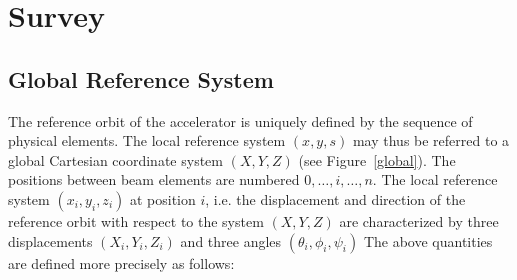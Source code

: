 
\chapter{Survey}
\label{survey}

\section{Global Reference System}
\label{layout}
The reference orbit of the accelerator is uniquely defined by the
sequence of physical elements.
The local reference system $(x, y, s)$ may thus be referred
to a global Cartesian coordinate system $(X, Y, Z)$
(see Figure~\ref{global}).
The positions between beam elements are numbered $0,\ldots,i,\ldots,n$.
The local reference system $(x_{i}, y_{i}, z_{i})$
at position $i$,
i.e. the displacement and direction of the reference orbit
with respect to the system $(X, Y, Z)$ are characterized by
three displacements $(X_{i}, Y_{i}, Z_{i})$
and three angles $(\theta_{i}, \phi_{i}, \psi_{i})$
The above quantities are defined more precisely as follows:
 
